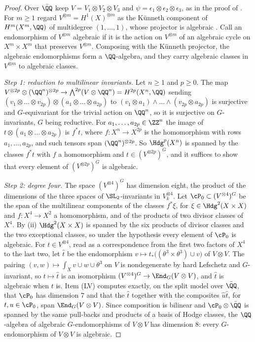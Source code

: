 \begin{proof}
Over $\bar{\QQ}$ keep $V=V_{1}\otimes V_{2}\otimes V_{3}$ and
$\psi=\epsilon_{1}\otimes\epsilon_{2}\otimes\epsilon_{3}$, as in the proof of
. For $m\ge1$ regard $V^{\otimes m}=H^{1}(X)^{\otimes m}$
as the K\"unneth component of $H^{m}(X^{m},\QQ)$ of multidegree
$(1,\dots,1)$, whose projector is algebraic \cite[\S2]{Kle68}. Call an
endomorphism of $V^{\otimes m}$ algebraic if it is the action on
$V^{\otimes m}$ of an algebraic cycle on $X^{m}\times X^{m}$ that preserves
$V^{\otimes m}$. Composing with the K\"unneth projector, the algebraic
endomorphisms form a $\QQ$-algebra, and they carry algebraic classes in
$V^{\otimes m}$ to algebraic classes.

\emph{Step 1: reduction to multilinear invariants.} Let $n\ge1$ and $p\ge0$.
The map $V^{\otimes2p}\otimes(\QQ^{n})^{\otimes2p}\to
\bigwedge^{2p}(V\otimes\QQ^{n})=H^{2p}(X^{n},\QQ)$ sending
$(v_{1}\otimes\dots\otimes v_{2p})\otimes(a_{1}\otimes\dots\otimes a_{2p})$ to
$(v_{1}\otimes a_{1})\wedge\dots\wedge(v_{2p}\otimes a_{2p})$ is surjective
and $G$-equivariant for the trivial action on $\QQ^{n}$, so it is surjective
on $G$-invariants, $G$ being reductive. For $a_{1},\dots,a_{2p}\in\ZZ^{n}$
the image of $t\otimes(a_{1}\otimes\dots\otimes a_{2p})$ is $f^{*}t$, where
$f\colon X^{n}\to X^{2p}$ is the homomorphism with rows $a_{1},\dots,a_{2p}$,
and such tensors span $(\QQ^{n})^{\otimes2p}$. So $\Hdg^{p}(X^{n})$ is
spanned by the classes $f^{*}t$ with $f$ a homomorphism and
$t\in(V^{\otimes2p})^{G}$, and it suffices to show that every element of
$(V^{\otimes2p})^{G}$ is algebraic.

\emph{Step 2: degree four.} The space $(V^{\otimes4})^{G}$ has dimension
eight, the product of the dimensions of the three spaces of
$\SL_{2}$-invariants in $V_{k}^{\otimes4}$. Let $\cP_{0}\subset
(V^{\otimes4})^{G}$ be the span of the multilinear components of the classes
$f^{*}\xi$, for $\xi\in\Hdg^{2}(X\times X)$ and $f\colon X^{4}\to X^{2}$ a
homomorphism, and of the products of two divisor classes of $X^{4}$. By
(ii) $\Hdg^{2}(X\times X)$ is spanned by the six
products of divisor classes and the two exceptional classes, so under the
hypothesis every element of $\cP_{0}$ is algebraic. For
$t\in V^{\otimes4}$, read as a correspondence from the first two factors of
$X^{4}$ to the last two, let $\hat{t}$ be the endomorphism
$v\mapsto t_{*}\bigl((\theta^{3}\times\theta^{3})\cup v\bigr)$ of
$V\otimes V$. The pairing $(v,w)\mapsto\int_{X}v\cup w\cup\theta^{3}$ on $V$
is nondegenerate by hard Lefschetz and $G$-invariant, so $t\mapsto\hat{t}$
is an isomorphism $(V^{\otimes4})^{G}\to\End_{G}(V\otimes V)$, and $\hat{t}$
is algebraic when $t$ is. Item (LV) computes exactly, on the split model over
$\bar{\QQ}$, that $\cP_{0}$ has dimension $7$ and that the $\hat{t}$ together
with the composites $\hat{u}\hat{t}$, for $t,u\in\cP_{0}$, span
$\End_{G}(V\otimes V)$. Since composition is bilinear and $\cP_{0}\otimes
\bar{\QQ}$ is spanned by the same pull-backs and products of a basis of
Hodge classes, the $\QQ$-algebra of algebraic $G$-endomorphisms of
$V\otimes V$ has dimension $8$: every $G$-endomorphism of $V\otimes V$ is
algebraic.


\end{proof}
